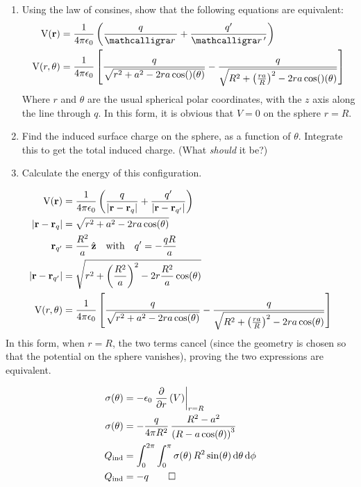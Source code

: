 \begin{hwkProblem}{3.8}{}

	\begin{enumerate}
		\item Using the law of consines, show that the following equations are equivalent:
			\begin{align}
				\func{V}[\vecb{r}] &= \frac{1}{4 \pi \epsilon_{0}} \left( \frac{q}{\rcurs} + \frac{q'}{\rcurs '} \right) \\
				\func{V}[r, \theta] &= \frac{1}{4 \pi \epsilon_{0}} \left[ \frac{q}{\sqrt{r^{2}+a^{2}-2ra\cos\left(\theta\right)}} - \frac{q}{\sqrt{R^{2}+{\left(\frac{ra}{R}\right)}^{2}-2ra\cos\left(\theta\right)}} \right]
			\end{align}
			Where \( r \) and \( \theta \) are the usual spherical polar coordinates, with the \( z \) axis along the line through \( q \). In this form, it is obvious that \( V = 0 \) on the sphere \( r = R \).
		\item Find the induced surface charge on the sphere, as a function of \( \theta \). Integrate this to get the total induced charge. (What \textit{should} it be?)
		\item Calculate the energy of this configuration.
	\end{enumerate}

	\hwkSol{}

	\hwkPart{}

	\begin{align*}
		\func{V}[\vecb{r}]&=\frac{1}{4\pi\epsilon_0}\left(\frac{q}{\left|\vecb{r}-\vecb{r}_q\right|}+\frac{q'}{\left|\vecb{r}-\vecb{r}_{q'}\right|}\right) \\
		\left|\vecb{r}-\vecb{r}_q\right|&=\sqrt{r^2+a^2-2ra\cos\theta} \\
		\vecb{r}_{q'}&=\frac{R^2}{a}\,\hat{z}\quad\text{with}\quad q'=-\frac{qR}{a} \\
		\left|\vecb{r}-\vecb{r}_{q'}\right|&=\sqrt{r^2+\left(\frac{R^2}{a}\right)^2-2r\frac{R^2}{a}\cos\theta} \\
		\func{V}[r, \theta]&=\frac{1}{4\pi\epsilon_0}\left[\frac{q}{\sqrt{r^2+a^2-2ra\cos\theta}}-\frac{q}{\sqrt{R^2+\left(\frac{ra}{R}\right)^2-2ra\cos\theta}}\right]
	\end{align*}
	In this form, when \(r=R\), the two terms cancel (since the geometry is chosen so that the potential on the sphere vanishes), proving the two expressions are equivalent.

	\hwkPart{}

	\begin{align*}
		\func{\sigma}[\theta]&=-\epsilon_0\left.\pderiv{r}{V}\right|_{r=R} \\
		\func{\sigma}[\theta]&=-\frac{q}{4\pi R^2}\,\frac{R^2-a^2}{{\left(R-a\cos{\theta}\right)}^3} \\
		Q_{\text{ind}}&=\int_0^{2\pi}\int_0^{\pi}\func{\sigma}[\theta]\,R^2\sin{\theta}\,\mathrm{d}\theta\,\mathrm{d}\phi \\
		Q_{\text{ind}}&=-q \qed
	\end{align*}


\end{hwkProblem}
